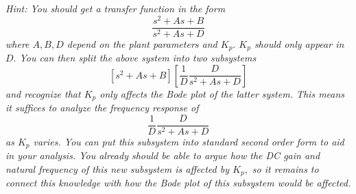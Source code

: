 \begin{deliverable}[label={lab2:report}]
\begin{enumerate}[label={(\arabic*)}]
{      \emph{Hint: You should get a transfer function in the form
      \[
        \frac{s^2 + A s + B}{s^2 + A s + D}
      \]
      where \(A, B, D\) depend on the plant parameters and \(K_p.\)
      \(K_p\) should only appear in \(D.\) You can then split the
      above system into two subsystems
      \[
        \left[s^2 + A s + B\right]
        \left[\frac{1}{D}\frac{D}{s^2 + A s + D}\right]
      \]
      and recognize that \(K_p\) only affects the Bode plot of the latter
      system. This means it suffices to analyze the frequency response of
      \[
        \frac{1}{D}\frac{D}{s^2 + A s + D}
      \]
      as \(K_p\) varies. You can put this subsystem into standard second order
      form to aid in your analysis. You already should be able to argue how the
      DC gain and natural frequency of this new subsystem is affected by
      \(K_p,\) so it remains to connect this knowledge with how the Bode plot
      of this subsystem would be affected.
      }
      \label{lab2:report:q8}
    }
  \end{enumerate}
\end{deliverable}

